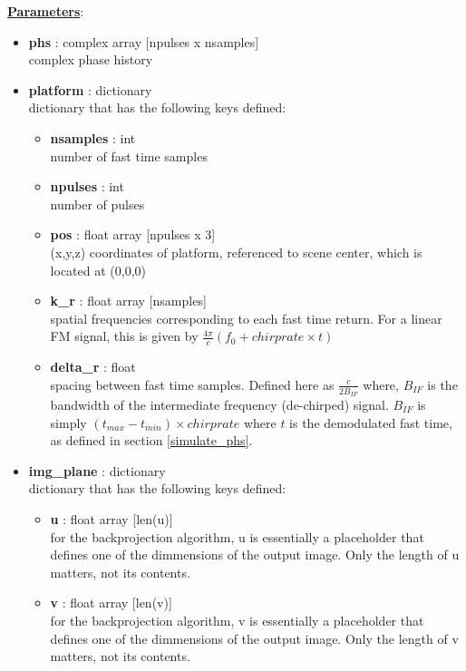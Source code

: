 \documentclass{article}
\newcommand{\defs}[2]{\textbf{{#1}} : {#2}}
\begin{document}
\noindent \underline{\textbf{Parameters}}:

\begin{itemize}
	\item \defs{phs}{complex array [npulses x nsamples]}\\
  	complex phase history
  	\item \defs{platform}{dictionary}\\
  	dictionary that has the following keys defined:
	\begin{itemize}
    	\item \defs{nsamples}{int}\\
    		number of fast time samples
	    \item \defs{npulses}{int}\\
	    	number of pulses
	    \item \defs{pos}{float array [npulses x 3]}\\
	       	(x,y,z) coordinates of platform, referenced to scene center, which is located at (0,0,0)
		\item\defs{k\_r}{float array [nsamples]}\\
	    	spatial frequencies corresponding to each fast time return.  For a linear FM signal, this is given by $\frac{4\pi}{c}(f_0+chirprate\times t)$
    	\item \defs{delta\_r}{float}\\
    	   	spacing between fast time samples.  Defined here as $\frac{c}{2B_{IF}}$ where, $B_{IF}$ is the bandwidth of the intermediate frequency (de-chirped) signal.  $B_{IF}$ is simply $(t_{max}-t_{min})\times chirprate$ where $t$ is the demodulated fast time, as defined in section \ref{simulate_phs}.
	\end{itemize}
  	\item \defs{img\_plane}{dictionary}\\
  	dictionary that has the following keys defined:
	\begin{itemize}
	    \item \defs{u}{float array [len(u)]}\\
	    	for the backprojection algorithm, u is essentially a placeholder that defines one of the dimmensions of the output image.  Only the length of u matters, not its contents.
	    \item \defs{v}{float array [len(v)]}\\
	    	for the backprojection algorithm, v is essentially a placeholder that defines one of the dimmensions of the output image.  Only the length of v matters, not its contents.

\end{itemize}
\end{itemize}
\end{document}
